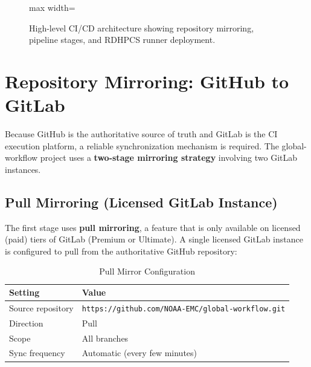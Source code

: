 \documentclass[11pt,letterpaper,twoside]{article}
\begin{document}
\begin{figure}[H]
\begin{adjustbox}{max width=\textwidth}
\end{adjustbox}
\caption{High-level CI/CD architecture showing repository mirroring,
  pipeline stages, and RDHPCS runner deployment.}
\label{fig:architecture}
\end{figure}


\section{Repository Mirroring: GitHub to GitLab}
\label{sec:mirroring}

Because GitHub is the authoritative source of truth and GitLab is the CI
execution platform, a reliable synchronization mechanism is required. The
global-workflow project uses a \textbf{two-stage mirroring strategy} involving
two GitLab instances.

\subsection{Pull Mirroring (Licensed GitLab Instance)}
\label{sec:pull-mirror}

The first stage uses \textbf{pull mirroring}, a feature that is only available
on licensed (paid) tiers of GitLab (Premium or Ultimate). A single licensed
GitLab instance is configured to pull from the authoritative GitHub repository:

\begin{table}[H]
\centering
\caption{Pull Mirror Configuration}
\label{tab:pull-mirror}
\begin{tabularx}{\linewidth}{lX}
\toprule
\textbf{Setting} & \textbf{Value} \\
\midrule
Source repository & \texttt{https://github.com/NOAA-EMC/global-workflow.git} \\
Direction & Pull \\
Scope & All branches \\
Sync frequency & Automatic (every few minutes) \\
\bottomrule
\end{tabularx}
\end{table}
\end{document}
